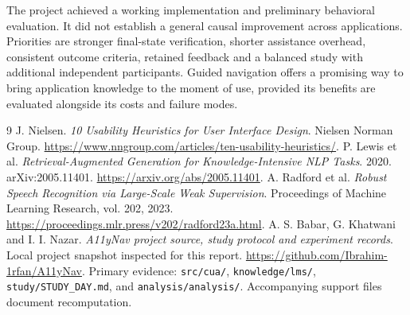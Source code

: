 \documentclass[11pt,a4paper]{article}
\begin{document}
The project achieved a working implementation and preliminary behavioral evaluation. It did not establish a general causal improvement across applications. Priorities are stronger final-state verification, shorter assistance overhead, consistent outcome criteria, retained feedback and a balanced study with additional independent participants. Guided navigation offers a promising way to bring application knowledge to the moment of use, provided its benefits are evaluated alongside its costs and failure modes.

\clearpage{}
\begin{thebibliography}{9}
 J. Nielsen. \emph{10 Usability Heuristics for User Interface Design}. Nielsen Norman Group. \url{https://www.nngroup.com/articles/ten-usability-heuristics/}.
 P. Lewis et al. \emph{Retrieval-Augmented Generation for Knowledge-Intensive NLP Tasks}. 2020. arXiv:2005.11401. \url{https://arxiv.org/abs/2005.11401}.
 A. Radford et al. \emph{Robust Speech Recognition via Large-Scale Weak Supervision}. Proceedings of Machine Learning Research, vol. 202, 2023. \url{https://proceedings.mlr.press/v202/radford23a.html}.
 A. S. Babar, G. Khatwani and I. I. Nazar. \emph{A11yNav project source, study protocol and experiment records}. Local project snapshot inspected for this report. \url{https://github.com/Ibrahim-1rfan/A11yNav}. Primary evidence: \texttt{src/cua/}, \texttt{knowledge/lms/}, \texttt{study/STUDY\_DAY.md}, and \texttt{analysis/analysis/}. Accompanying support files document recomputation.
\end{thebibliography}
\end{document}
